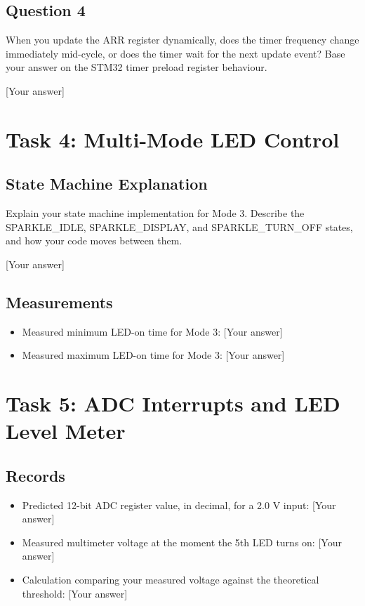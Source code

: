 \documentclass[11pt]{article}
\begin{document}
\subsection{Question 4}
When you update the ARR register dynamically, does the timer frequency change immediately mid-cycle, or does the timer wait for the next update event? Base your answer on the STM32 timer preload register behaviour.

[Your answer]

\section{Task 4: Multi-Mode LED Control}

\subsection{State Machine Explanation}
Explain your state machine implementation for Mode 3. Describe the SPARKLE\_IDLE, SPARKLE\_DISPLAY, and SPARKLE\_TURN\_OFF states, and how your code moves between them.

[Your answer]

\subsection{Measurements}
\begin{itemize}
    \item Measured minimum LED-on time for Mode 3: [Your answer]
    \item Measured maximum LED-on time for Mode 3: [Your answer]
\end{itemize}

\section{Task 5: ADC Interrupts and LED Level Meter}

\subsection{Records}
\begin{itemize}
    \item Predicted 12-bit ADC register value, in decimal, for a 2.0 V input: [Your answer]
    \item Measured multimeter voltage at the moment the 5th LED turns on: [Your answer]
    \item Calculation comparing your measured voltage against the theoretical threshold: [Your answer]
\end{itemize}
\end{document}
